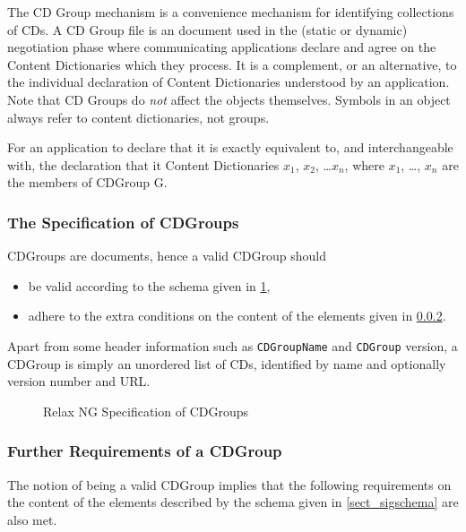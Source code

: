 The CD Group mechanism is a convenience mechanism for identifying collections of CDs.  A
CD Group file is an \XML document used in the (static or dynamic) negotiation phase where
communicating applications declare and agree on the Content Dictionaries which they
process.  It is a complement, or an alternative, to the individual declaration of Content
Dictionaries understood by an application.  Note that CD Groups do \emph{not} affect the
\OM objects themselves.  Symbols in an object always refer to content dictionaries, not
groups.

For an application to declare that it  is exactly
equivalent to, and interchangeable with, the declaration that it 
Content Dictionaries $x_1$, $x_2$, \ldots $x_n$, where $x_1$, \ldots, $x_n$ are the
members of CDGroup G.

\subsubsection{The Specification of CDGroups}\label{sec_dtd_cdg}

CDGroups are \XML documents, hence  a valid  CDGroup
 should 
\begin{itemize}
\item be valid according to the schema given in \ref{fig_cdgroup.dtd},
\item adhere to the extra conditions on the content of the elements
  given in \ref{sect_cdgpcdata}.
\end{itemize}

Apart from some header information such as \lstinline|CDGroupName| and
\lstinline|CDGroup| version, a CDGroup is simply an unordered list of
CDs, identified by name and optionally version number and URL.

\begin{figure}\centering
  
  \caption{Relax NG Specification of CDGroups}\label{fig_cdgroup.dtd}
\end{figure}


\subsubsection{Further Requirements of a CDGroup}\label{sect_cdgpcdata}

The notion of being a valid CDGroup implies that the following requirements on the content
of the elements described by the schema given in \ref{sect_sigschema} are also met.

